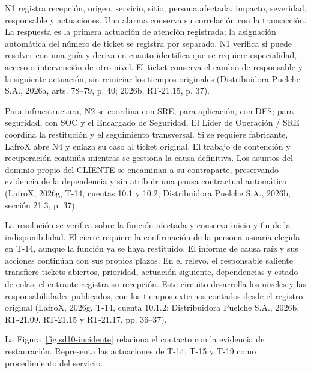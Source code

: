 N1 registra recepción, origen, servicio, sitio, persona afectada, impacto, severidad, responsable y actuaciones. Una alarma conserva su correlación con la transacción. La respuesta es la primera actuación de atención registrada; la asignación automática del número de ticket se registra por separado. N1 verifica si puede resolver con una guía y deriva en cuanto identifica que se requiere especialidad, acceso o intervención de otro nivel. El ticket conserva el cambio de responsable y la siguiente actuación, sin reiniciar los tiempos originales (Distribuidora Puelche S.A., 2026a, arts. 78--79, p. 40; 2026b, RT-21.15, p. 37).

Para infraestructura, N2 se coordina con SRE; para aplicación, con DES; para seguridad, con SOC y el Encargado de Seguridad. El Líder de Operación / SRE coordina la restitución y el seguimiento transversal. Si se requiere fabricante, LafroX abre N4 y enlaza su caso al ticket original. El trabajo de contención y recuperación continúa mientras se gestiona la causa definitiva. Los asuntos del dominio propio del CLIENTE se encaminan a su contraparte, preservando evidencia de la dependencia y sin atribuir una pausa contractual automática (LafroX, 2026g, T-14, cuentas 10.1 y 10.2; Distribuidora Puelche S.A., 2026b, sección 21.3, p. 37).

La resolución se verifica sobre la función afectada y conserva inicio y fin de la indisponibilidad. El cierre requiere la confirmación de la persona usuaria elegida en T-14, aunque la función ya se haya restituido. El informe de causa raíz y sus acciones continúan con sus propios plazos. En el relevo, el responsable saliente transfiere tickets abiertos, prioridad, actuación siguiente, dependencias y estado de colas; el entrante registra su recepción. Este circuito desarrolla los niveles y las responsabilidades publicados, con los tiempos externos contados desde el registro original (LafroX, 2026g, T-14, cuenta 10.1.2; Distribuidora Puelche S.A., 2026b, RT-21.09, RT-21.15 y RT-21.17, pp. 36--37).

La Figura~\ref{fig:sd10-incidente} relaciona el contacto con la evidencia de restauración. Representa las actuaciones de T-14, T-15 y T-19 como procedimiento del servicio.

